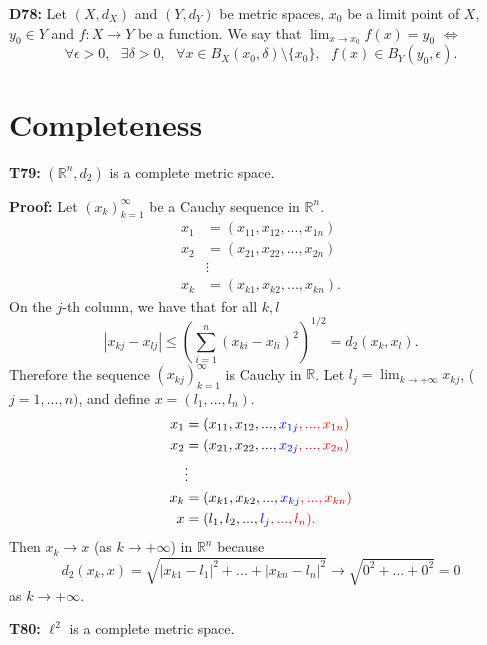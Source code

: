\documentclass[twocolumn,10pt]{article}
\begin{document}
\textbf{D78:} Let $(X,d_X)$ and $(Y,d_Y)$ be metric spaces, $x_0$ be a limit point of $X$, $y_0\in Y$ and $f:X\to Y$ be a function. We say that $\lim_{x\to x_0}f(x)=y_0$ $\Leftrightarrow$
\begin{equation*}
    \forall\epsilon>0, \text{ } \exists\delta>0, \text{ } \forall x\in B_X(x_0,\delta)\setminus\{x_0\}, \text{ } f(x)\in B_Y(y_0,\epsilon).
\end{equation*}

\section{Completeness}

\textbf{T79:} $(\mathbb{R}^n,d_2)$ is a complete metric space.

\color{red}
\textbf{Proof:} Let $(x_k)_{k=1}^{\infty}$ be a Cauchy sequence in $\mathbb{R}^n$.
\begin{align*}
    x_1 &= (x_{11},x_{12},...,x_{1n})\\
    x_2 &= (x_{21},x_{22},...,x_{2n})\\
    &\vdots\\
    x_k &= (x_{k1},x_{k2},...,x_{kn}).
\end{align*}
On the $j$-th column, we have that for all $k,l$
\begin{equation*}
    |x_{kj}-x_{lj}| \leq \left(\sum_{i=1}^n(x_{ki}-x_{li})^2\right)^{1/2} = d_2(x_k,x_l).
\end{equation*}
Therefore the sequence $(x_{kj})_{k=1}^{\infty}$ is Cauchy in $\mathbb{R}$. Let $l_j=\lim_{k\to+\infty}x_{kj}$, ($j=1,...,n)$, and define $x=(l_1,...,l_n)$.
\begin{align*}
    x_1 &= (x_{11},x_{12},...,\color{blue} x_{1j} \color{red},...,x_{1n})\\
    x_2 &= (x_{21},x_{22},...,\color{blue} x_{2j} \color{red},...,x_{2n})\\
    &\vdots\\
    x_k &= (x_{k1},x_{k2},...,\color{blue} x_{kj} \color{red},...,x_{kn})\\
    x &= (l_1,l_2,..., \color{blue} l_j \color{red},...,l_n).
\end{align*}
Then $x_k\to x$ (as $k\to+\infty$) in $\mathbb{R}^n$ because
\begin{equation*}
    d_2(x_k,x) = \sqrt{|x_{k1}-l_1|^2 + ... + |x_{kn}-l_n|^2} \to \sqrt{0^2+...+0^2}=0
\end{equation*}
as $k\to+\infty$.
\color{black}

\textbf{T80:} $\ell^2$ is a complete metric space.
\end{document}
